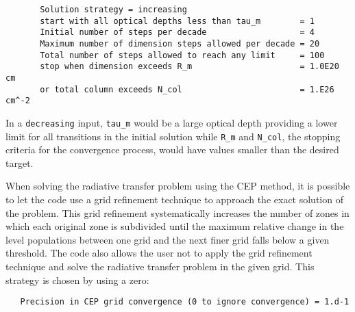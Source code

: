 \documentclass[12pt]{article}
\def\separation {0.5cm}
\begin{document}
\vspace{\separation}
\begin{verbatim}
       Solution strategy = increasing
       start with all optical depths less than tau_m        = 1
       Initial number of steps per decade                   = 4
       Maximum number of dimension steps allowed per decade = 20
       Total number of steps allowed to reach any limit     = 100
       stop when dimension exceeds R_m                      = 1.0E20 cm
       or total column exceeds N_col                        = 1.E26 cm^-2
\end{verbatim}
In a {\tt decreasing} input, {\tt tau\_m} would be a large optical depth
providing a lower limit for all transitions in the initial solution while
{\tt R\_m} and {\tt N\_col}, the stopping criteria for the convergence process,
would have values smaller than the desired target.

When solving the radiative transfer problem using the CEP method, it is
possible to let the code use a grid refinement technique to approach the exact
solution of the problem. This grid refinement systematically increases the
number of zones in which each original zone is subdivided until the maximum
relative change in the level populations between one grid and the next finer
grid falls below a given threshold. The code also allows the user not to apply
the grid refinement technique and solve the radiative transfer problem in the
given grid. This strategy is chosen by using a zero:

\vspace{\separation}
\begin{verbatim}
   Precision in CEP grid convergence (0 to ignore convergence) = 1.d-1
\end{verbatim}
\end{document}
